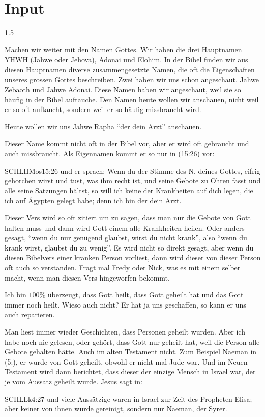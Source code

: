 \documentclass[fontsize=14pt]{../../inc/mybib}
\begin{document}
\section{Input}
\begin{spacing}{1.5}
   \begin{block}[Gottesnamen]
    Machen wir weiter mit den Namen Gottes. Wir haben die drei Hauptnamen YHWH (Jahwe oder Jehova), Adonai und Elohim. In der Bibel finden wir aus diesen Hauptnamen diverse zusammengesetzte Namen, die oft die Eigenschaften unseres grossen Gottes beschreiben. Zwei haben wir uns schon angeschaut, Jahwe Zebaoth und Jahwe Adonai. Diese Namen haben wir angeschaut, weil sie so häufig in der Bibel auftauche. Den Namen heute wollen wir anschauen, nicht weil er so oft auftaucht, sondern weil er so häufig missbraucht wird. 

    Heute wollen wir uns Jahwe Rapha \enquote{der \herr{} dein Arzt} anschauen.  
    \end{block}
    \begin{block}
        Dieser Name kommt nicht oft in der Bibel vor, aber er wird oft gebraucht und auch missbraucht. Als Eigennamen kommt er so nur in (15:26) vor:
        \begin{bibelbox}{SCHL}{IIMos}{15:26}
            und er sprach: Wenn du der Stimme des \herr N, deines Gottes, eifrig gehorchen wirst und tust, was ihm recht ist, und seine Gebote zu Ohren fasst und alle seine Satzungen hältst, so will ich keine der Krankheiten auf dich legen, die ich auf Ägypten gelegt habe; denn ich bin der \herr{} dein Arzt.
        \end{bibelbox}
        
        Dieser Vers wird so oft zitiert um zu sagen, dass man nur die Gebote von Gott halten muss und dann wird Gott einem alle Krankheiten heilen. Oder anders gesagt, \enquote{wenn du nur genügend glaubst, wirst du nicht krank}, also \enquote{wenn du krank wirst, glaubst du zu wenig}. Es wird nicht so direkt gesagt, aber wenn du diesen Bibelvers einer kranken Person vorliest, dann wird dieser von dieser Person oft auch so verstanden. Fragt mal Fredy oder Nick, was es mit einem selber macht, wenn man diesen Vers hingeworfen bekommt.

        Ich bin $100\%$ überzeugt, dass Gott heilt, dass Gott geheilt hat und das Gott immer noch heilt. Wieso auch nicht? Er hat ja uns geschaffen, so kann er uns auch reparieren. 
        
        Man liest immer wieder Geschichten, dass Personen geheilt wurden. Aber ich habe noch nie gelesen, oder gehört, dass Gott nur geheilt hat, weil die Person alle Gebote gehalten hätte. Auch im alten Testament nicht. Zum Beispiel Naeman in (5:), er wurde von Gott geheilt, obwohl er nicht mal Jude war. Und im Neuen Testament wird dann berichtet, dass dieser der einzige Mensch in Israel war, der je vom Aussatz geheilt wurde. Jesus sagt in:
        \begin{bibelbox}{SCHL}{Lk}{4:27}
            und viele Aussätzige waren in Israel zur Zeit des Propheten Elisa; aber keiner von ihnen wurde gereinigt, sondern nur Naeman, der Syrer.
        \end{bibelbox}


\end{block}
\end{spacing}
\end{document}
